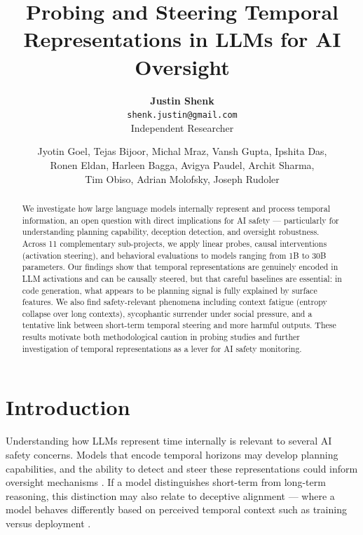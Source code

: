 \documentclass[final]{sparreport}
\title{Probing and Steering Temporal Representations in LLMs for AI Oversight}
\author{
  \textbf{Justin Shenk}\\
  \texttt{shenk.justin@gmail.com}\\
  Independent Researcher
  \and
  Jyotin Goel,
  Tejas Bijoor,
  Michal Mraz,
  Vansh Gupta,
  Ipshita Das,\\
  Ronen Eldan,
  Harleen Bagga,
  Avigya Paudel,
  Archit Sharma,\\
  Tim Obiso,
  Adrian Molofsky,
  Joseph Rudoler
}
\begin{document}
\maketitle

\begin{abstract}
We investigate how large language models internally represent and process temporal information, an open question with direct implications for AI safety --- particularly for understanding planning capability, deception detection, and oversight robustness. Across 11 complementary sub-projects, we apply linear probes, causal interventions (activation steering), and behavioral evaluations to models ranging from 1B to 30B parameters. Our findings show that temporal representations are genuinely encoded in LLM activations and can be causally steered, but that careful baselines are essential: in code generation, what appears to be planning signal is fully explained by surface features. We also find safety-relevant phenomena including context fatigue (entropy collapse over long contexts), sycophantic surrender under social pressure, and a tentative link between short-term temporal steering and more harmful outputs. These results motivate both methodological caution in probing studies and further investigation of temporal representations as a lever for AI safety monitoring.
\end{abstract}


\section{Introduction}

Understanding how LLMs represent time internally is relevant to several AI safety concerns. Models that encode temporal horizons may develop planning capabilities, and the ability to detect and steer these representations could inform oversight mechanisms \cite{li2023inference, rimsky2024steering}. If a model distinguishes short-term from long-term reasoning, this distinction may also relate to deceptive alignment \cite{hubinger2019risks} --- where a model behaves differently based on perceived temporal context such as training versus deployment \cite{park2023ai}.
\end{document}
